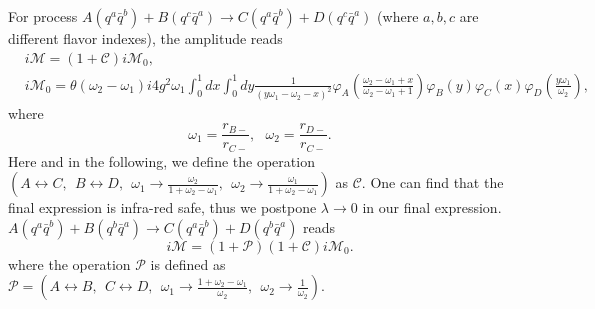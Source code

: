 \documentclass[8pt]{beamer}
\begin{document}
\begin{frame}
	For process $A(q^a\bar q^b)+B(q^c\bar q^a)\rightarrow C(q^a\bar
		q^b)+D(q^c\bar q^a)$ (where $a,b,c$ are different flavor indexes), the amplitude reads
	\begin{align*}
		  & i\mathcal{M} =(1+\mathcal{C})i\mathcal{M}_0,\nonumber          \\
		  & i\mathcal{M}_0 =\theta(\omega_2-\omega_1)i4g^2\omega_1\int_0^1
		dx\int_0^1
		dy\frac{1}{(y\omega_1-\omega_2-x)^2}\varphi_A(\frac{\omega_2-\omega_1+x}{\omega_2-\omega_1+1})\varphi_B(y)
		\varphi_C(x)\varphi_D(\frac{y\omega_1}{\omega_2}),\nonumber
	\end{align*}
	where
	\begin{equation}
		\omega_1=\frac{r_{B-}}{r_{C-}},\ \ \ \omega_2=\frac{r_{D-}}{r_{C-}}.
	\end{equation}
	Here and in the following, we define the operation
	$(A\leftrightarrow C,\ \ B\leftrightarrow D,\ \ \omega_1\rightarrow
		\frac{\omega_2}{1+\omega_2-\omega_1},\ \ \omega_2\rightarrow
		\frac{\omega_1}{1+\omega_2-\omega_1})$ as $\mathcal{C}$. One can
	find that the final expression is infra-red safe, thus we postpone
	$\lambda\rightarrow 0$ in our final expression.
	$A(q^a \bar q^b)+B(q^b\bar
		q^a)\rightarrow C(q^a\bar q^b)+D(q^b\bar q^a) $ reads
	\begin{equation}
		i\mathcal{M}=(1+\mathcal{P})(1+\mathcal{C})i\mathcal{M}_{0}.
	\end{equation}
	where the operation $\mathcal{P}$ is defined as
	$\mathcal{P}=(A\leftrightarrow B,\ \ C\leftrightarrow D,\ \
		\omega_1\rightarrow \frac{1+\omega_2-\omega_1}{\omega_2},\ \
		\omega_2\rightarrow \frac{1}{\omega_2})$.
\end{frame}
\end{document}
